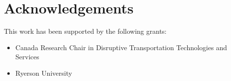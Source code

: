 \thispagestyle{plain}
\section*{Acknowledgements}

\begin{flushleft}
This work has been supported by the following grants:
\begin{itemize}
    \item Canada Research Chair in Disruptive Transportation Technologies and Services
    \item Ryerson University
\end{itemize}
\end{flushleft}
